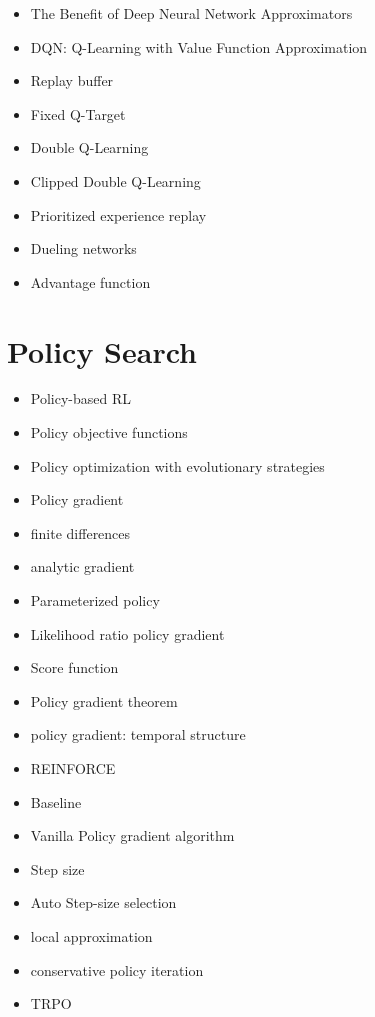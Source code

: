 \documentclass[]{article}
\begin{document}
\begin{itemize}
\itemsep-0.5em
    \item The Benefit of Deep Neural Network Approximators
    \item DQN: Q-Learning with Value Function Approximation
    \item Replay buffer
    \item Fixed Q-Target
    \item Double Q-Learning
    \item Clipped Double Q-Learning
    \item Prioritized experience replay
    \item Dueling networks
    \item Advantage function
\end{itemize}

\section{Policy Search}

\begin{itemize}
\itemsep-0.5em
    \item Policy-based RL
    \item Policy objective functions
    \item Policy optimization with evolutionary strategies
    \item Policy gradient
    \item finite differences
    \item analytic gradient
    \item Parameterized policy
    \item Likelihood ratio policy gradient
    \item Score function
    \item Policy gradient theorem
    \item policy gradient: temporal structure
    \item REINFORCE
    \item Baseline
    \item Vanilla Policy gradient algorithm
    \item Step size
    \item Auto Step-size selection
    \item local approximation
    \item conservative policy iteration
    \item TRPO
\end{itemize}
\end{document}
